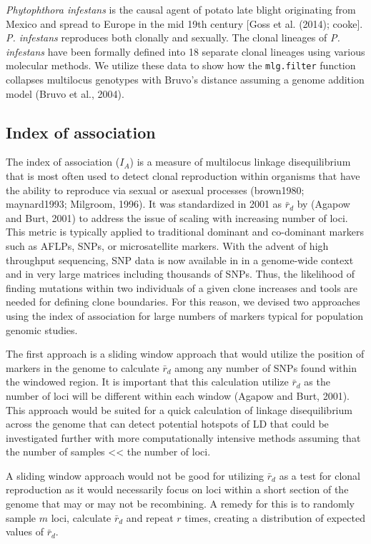 \documentclass{frontiersSCNS} %
\begin{document}
\emph{Phytophthora infestans} is the causal agent of potato late blight
originating from Mexico and spread to Europe in the mid 19th century
{[}Goss et al. (2014); cooke{]}. \emph{P. infestans} reproduces both
clonally and sexually. The clonal lineages of \emph{P. infestans} have
been formally defined into 18 separate clonal lineages using various
molecular methods. We utilize these data to show how the
\texttt{mlg.filter} function collapses multilocus genotypes with Bruvo's
distance assuming a genome addition model (Bruvo et al., 2004).

\subsection*{Index of association}\label{index-of-association}

The index of association (\(I_A\)) is a measure of multilocus linkage
disequilibrium that is most often used to detect clonal reproduction
within organisms that have the ability to reproduce via sexual or
asexual processes (brown1980; maynard1993; Milgroom, 1996). It was
standardized in 2001 as \(\bar{r}_d\) by (Agapow and Burt, 2001) to
address the issue of scaling with increasing number of loci. This metric
is typically applied to traditional dominant and co-dominant markers
such as AFLPs, SNPs, or microsatellite markers. With the advent of high
throughput sequencing, SNP data is now available in in a genome-wide
context and in very large matrices including thousands of SNPs. Thus,
the likelihood of finding mutations within two individuals of a given
clone increases and tools are needed for defining clone boundaries. For
this reason, we devised two approaches using the index of association
for large numbers of markers typical for population genomic studies.

The first approach is a sliding window approach that would utilize the
position of markers in the genome to calculate \(\bar{r}_d\) among any
number of SNPs found within the windowed region. It is important that
this calculation utilize \(\bar{r}_d\) as the number of loci will be
different within each window (Agapow and Burt, 2001). This approach
would be suited for a quick calculation of linkage disequilibrium across
the genome that can detect potential hotspots of LD that could be
investigated further with more computationally intensive methods
assuming that the number of samples \textless{}\textless{} the number of
loci.

A sliding window approach would not be good for utilizing \(\bar{r}_d\)
as a test for clonal reproduction as it would necessarily focus on loci
within a short section of the genome that may or may not be recombining.
A remedy for this is to randomly sample \(m\) loci, calculate
\(\bar{r}_d\) and repeat \(r\) times, creating a distribution of
expected values of \(\bar{r}_d\).
\end{document}
